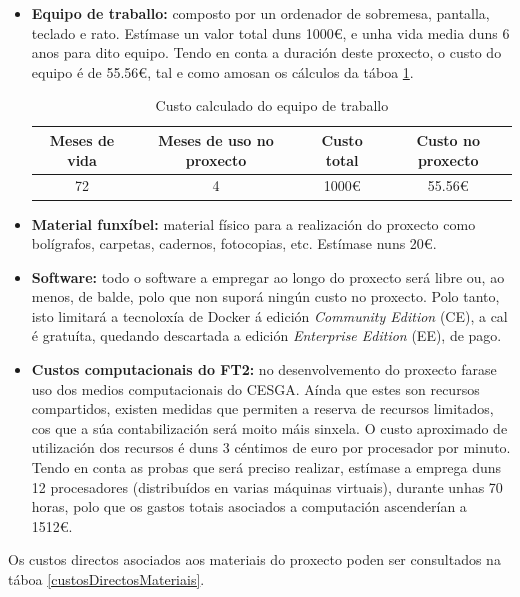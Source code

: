 \begin{itemize}
    \item \textbf{Equipo de traballo:} composto por un ordenador de sobremesa, pantalla, teclado e rato. Estímase un valor total duns 1000\euro, e unha vida media duns 6 anos para dito equipo. Tendo en conta a duración deste proxecto, o custo do equipo é de 55.56\euro, tal e como amosan os cálculos da táboa \ref{custoEquipoTraballo}.
    
    \begin{table}[H]
    \centering
    \caption{Custo calculado do equipo de traballo}
    \label{custoEquipoTraballo}
    \begin{tabular}{|c|c|c|c|}
    \hline
    Meses de vida & Meses de uso no proxecto & Custo total & Custo no proxecto \\ \hline
    72 & 4 & 1000\euro & 55.56\euro \\ \hline
    \end{tabular}
    \end{table}
    
    \item \textbf{Material funxíbel:} material físico para a realización do proxecto como bolígrafos, carpetas, cadernos, fotocopias, etc. Estímase nuns 20\euro.
    \item \textbf{Software:} todo o software a empregar ao longo do proxecto será libre ou, ao menos, de balde, polo que non suporá ningún custo no proxecto. Polo tanto, isto limitará a tecnoloxía de Docker á edición \textit{Community Edition} (CE), a cal é gratuíta, quedando descartada a edición \textit{Enterprise Edition} (EE), de pago.
    \item \textbf{Custos computacionais do \gls{FT2}:} no desenvolvemento do proxecto farase uso dos medios computacionais do \gls{CESGA}. Aínda que estes son recursos compartidos, existen medidas que permiten a reserva de recursos limitados, cos que a súa contabilización será moito máis sinxela. O custo aproximado de utilización dos recursos é duns 3 céntimos de euro por procesador por minuto. Tendo en conta as probas que será preciso realizar, estímase a emprega duns 12 procesadores (distribuídos en varias máquinas virtuais), durante unhas 70 horas, polo que os gastos totais asociados a computación ascenderían a 1512\euro.
\end{itemize}

Os custos directos asociados aos materiais do proxecto poden ser consultados na táboa \ref{custosDirectosMateriais}.

